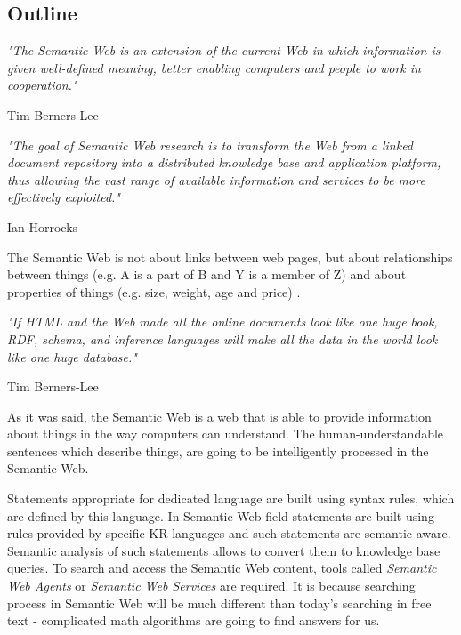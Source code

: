 \newpage

\subsection{Outline}
\label{sub:semWebOutline}

\noindent \textit{"The Semantic Web is an extension of the current Web in which information is given well-defined meaning, better enabling computers and people to work in cooperation."} 
\begin{flushright} Tim Berners-Lee \cite{BHL01} \end{flushright}

\noindent \textit{"The goal of Semantic Web research is to transform the Web from a linked document repository into a distributed knowledge base and application platform, thus allowing the vast range of available information and services to be more effectively exploited."} 
\begin{flushright} Ian Horrocks \cite{HorSSF} \end{flushright}

\noindent The Semantic Web is not about links between web pages, but about relationships between things (e.g. A is a part of B and Y is a member of Z) and about properties of things (e.g. size, weight, age and price) \cite{SemWebTutorial}.

\bigskip

\noindent \textit{"If HTML and the Web made all the online documents look like one huge book, RDF, schema, and inference languages will make all the data in the world look like one huge database."}
\begin{flushright} Tim Berners-Lee \cite{BLF99} \end{flushright}

\noindent As it was said, the Semantic Web is a web that is able to provide information about things in the way computers can understand. The human-understandable sentences which describe things, are going to be intelligently processed in the Semantic Web. 

Statements appropriate for dedicated language are built using syntax rules, which are defined by this language. In Semantic Web field statements are built using rules provided by specific KR languages and such statements are semantic aware. Semantic analysis of such statements allows to convert them to knowledge base queries. To search and access the Semantic Web content, tools called \textit{Semantic Web Agents} or \textit{Semantic Web Services} are required. It is because searching process in Semantic Web will be much different than today's searching in free text - complicated math algorithms are going to find answers for us.

